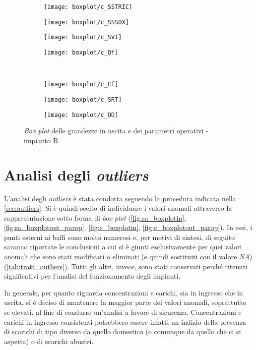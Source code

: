 \begin{figure}[h]
\begin{subfigure}{0.24\textwidth}
		\texttt{[image: boxplot/c\_SSTRIC]}	\centering
	\end{subfigure}
	\begin{subfigure}{0.24\textwidth}
		\texttt{[image: boxplot/c\_SSSOX]}	\centering
	\end{subfigure}
	\begin{subfigure}{0.24\textwidth}
		\texttt{[image: boxplot/c\_SVI]}\centering
	\end{subfigure}
	\begin{subfigure}{0.24\textwidth}
		\texttt{[image: boxplot/c\_Qf]}	\centering
	\end{subfigure}
	\\[1ex]
	\begin{subfigure}{0.24\textwidth}
		\texttt{[image: boxplot/c\_Cf]}	\centering
	\end{subfigure}
	\begin{subfigure}{0.24\textwidth}
		\texttt{[image: boxplot/c\_SRT]}	\centering
	\end{subfigure}
		\begin{subfigure}{0.24\textwidth}
		\texttt{[image: boxplot/c\_OD]}	\centering
	\end{subfigure}
	\caption{\textit{Box plot} delle grandezze in uscita e dei parametri operativi - impianto B}
	\label{fig:c_boxplotout_parop}
\end{figure}

\section{Analisi degli \textit{outliers}}
L'analisi degli \textit{outliers} è stata condotta seguendo la procedura indicata nella \autoref{sec:outliers}.
Si è quindi scelto di individuare i valori anomali attraverso la rappresentazione sotto forma di \textit{box plot} (\autoref{fig:sa_boxplotin}, \autoref{fig:sa_boxplotout_parop}, \autoref{fig:c_boxplotin}, \autoref{fig:c_boxplotout_parop}). 
In essi, i punti esterni ai baffi sono molto numerosi e, per motivi di sintesi, di seguito saranno riportate le conclusioni a cui si è giunti esclusivamente per quei valori anomali che sono stati modificati o eliminati (e quindi sostituiti con il valore \textit{NA}) (\autoref{tab:tratt_outliers}). Tutti gli altri, invece, sono stati conservati perché ritenuti significativi per l'analisi del funzionamento degli impianti.

In generale, per quanto riguarda concentrazioni e carichi, sia in ingresso che in uscita, si è deciso di mantenere la maggior parte dei valori anomali, soprattutto se elevati, al fine di condurre un'analisi a favore di sicurezza. Concentrazioni e carichi in ingresso consistenti potrebbero essere infatti un indizio della presenza di scarichi di tipo diverso da quello domestico (o comunque da quello che ci si aspetta) o di scarichi abusivi.


